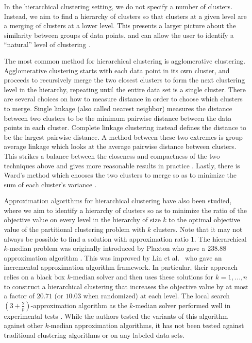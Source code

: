 \documentclass{article}
\begin{document}
In the hierarchical clustering setting, we do not specify a number of clusters. Instead, we aim to find a hierarchy of clusters so that clusters at a given level are a merging of clusters at a lower level. This presents a larger picture about the similarity between groups of data points, and can allow the user to identify a ``natural'' level of clustering \cite{ESL}. 

The most common method for hierarchical clustering is agglomerative clustering. Agglomerative clustering starts with each data point in its own cluster, and proceeds to recursively merge the two closest clusters to form the next clustering level in the hierarchy, repeating until the entire data set is a single cluster.  There are several choices on how to measure distance in order to choose which clusters to merge. Single linkage (also called nearest neighbor) measures the distance between two clusters to be the minimum pairwise distance between the data points in each cluster.  Complete linkage clustering instead defines the distance to be the largest pairwise distance. A method between these two extremes is group average linkage which looks at the average pairwise distance between clusters. This strikes a balance between the closeness and compactness of the two techniques above and gives more reasonable results in practice \cite{ESL}. Lastly, there is Ward's method which chooses the two clusters to merge so as to minimize the sum of each cluster's variance \cite{Ward}.

Approximation algorithms for hierarchical clustering have also been studied, where we aim to identify a hierarchy of clusters so as to minimize the ratio of the objective value on every level in the hierarchy of size $k$ to the optimal objective value of the partitional clustering problem with $k$ clusters. Note that it may not always be possible to find a solution with approximation ratio 1. The hierarchical $k$-median problem was originally introduced by Plaxton who gave a 238.88 approximation algorithm \cite{Plaxton}. This was improved by Lin et al.~\cite{Lin} who gave an incremental approximation algorithm framework. In particular, their approach relies on a black box $k$-median solver and then uses these solutions for $k=1, \ldots, n$ to construct a hierarchical clustering that increases the objective value by at most a factor of $20.71$ (or $10.03$ when randomized) at each level. The local search $(3+\frac{2}{p})$-approximation algorithm as the $k$-median solver performed well in experimental tests \cite{Nagarajan}. While the authors tested the variants of this algorithm against other $k$-median approximation algorithms, it has not been tested against traditional clustering algorithms or on any labeled data sets. 
\end{document}
